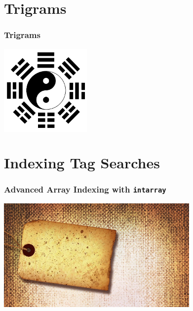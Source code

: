 \documentclass{beamer}
\begin{document}
\section{Trigrams}

\begin{frame}[fragile]
  \frametitle{Trigrams}

\begin{center}
  \includegraphics[height=12em]{trigramme.png}
\end{center}
\end{frame}

\section{Indexing Tag Searches}

\begin{frame}[fragile]
  \frametitle{Advanced Array Indexing with \texttt{intarray}}

\begin{center}
  \includegraphics[height=15em]{wordpres-seo-categories-tags.jpg}
\end{center}
\end{frame}
\end{document}
